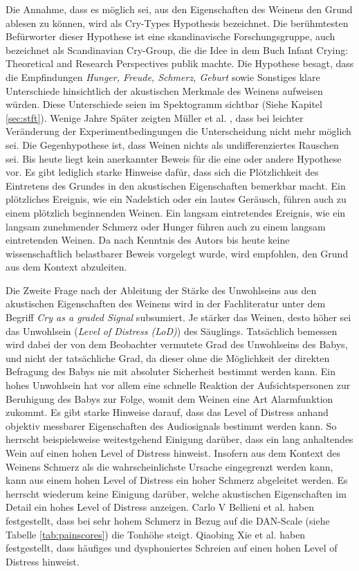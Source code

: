 Die Annahme, dass es möglich sei, aus den Eigenschaften des Weinens den Grund ablesen zu können, wird als \glqq Cry-Types Hypothesis\grqq{} bezeichnet. Die berühmtesten Befürworter dieser Hypothese ist eine skandinavische Forschungsgruppe, auch bezeichnet als \glqq Scandinavian Cry-Group\grqq , die die Idee in dem Buch \glqq Infant Crying: Theoretical and Research Perspectives\grqq \cite{crygroup} publik machte. Die Hypothese besagt, dass die Empfindungen \emph{Hunger, Freude, Schmerz, Geburt} sowie {Sonstiges} klare Unterschiede hinsichtlich der akustischen Merkmale des Weinens aufweisen würden. Diese Unterschiede seien im Spektogramm sichtbar (Siehe Kapitel \ref{sec:stft}). Wenige Jahre Später zeigten Müller et al. \cite{cryisnoise}, dass bei leichter Veränderung der Experimentbedingungen die Unterscheidung nicht mehr möglich sei. Die Gegenhypothese ist, dass Weinen \glqq nichts als undifferenziertes Rauschen\grqq{} sei. Bis heute liegt kein anerkannter Beweis für die eine oder andere Hypothese vor. Es gibt lediglich starke Hinweise dafür, dass sich die Plötzlichkeit des Eintretens des Grundes in den akustischen Eigenschaften bemerkbar macht. Ein plötzliches Ereignis, wie ein Nadelstich oder ein lautes Geräusch, führen auch zu einem plötzlich beginnenden Weinen. Ein langsam eintretendes Ereignis, wie ein langsam zunehmender Schmerz oder Hunger führen auch zu einem langsam eintretenden Weinen. Da nach Kenntnis des Autors bis heute keine wissenschaftlich belastbarer Beweis vorgelegt wurde, wird empfohlen, den Grund aus dem Kontext abzuleiten.\cite[S. 9 - 13, 17 - 19]{signal}

Die Zweite Frage nach der Ableitung der Stärke des Unwohlseins aus den akustischen Eigenschaften des Weinens wird in der Fachliteratur unter dem Begriff \emph{Cry as a graded Signal} subsumiert. Je \glqq stärker\grqq{} das Weinen, desto höher sei das Unwohlsein (\emph{Level of Distress (LoD)}) des Säuglings. Tatsächlich bemessen wird dabei der von dem Beobachter vermutete Grad des Unwohlseins des Babys, und nicht der tatsächliche Grad, da dieser ohne die Möglichkeit der direkten Befragung des Babys nie mit absoluter Sicherheit bestimmt werden kann. Ein hohes Unwohlsein hat vor allem eine schnelle Reaktion der Aufsichtspersonen zur Beruhigung des Babys zur Folge, womit dem Weinen eine Art Alarmfunktion zukommt. Es gibt starke Hinweise darauf, dass das Level of Distress anhand objektiv messbarer Eigenschaften des Audiosignals bestimmt werden kann. So herrscht beispielsweise weitestgehend Einigung darüber, dass ein \glqq lang\grqq{} anhaltendes Wein auf einen hohen Level of Distress hinweist. Insofern aus dem Kontext des Weinens Schmerz als die wahrscheinlichste Ursache eingegrenzt werden kann, kann aus einem hohen Level of Distress ein hoher Schmerz abgeleitet werden. \cite[S. 13 - 17]{signal} \cite{lod} Es herrscht wiederum keine Einigung darüber, welche akustischen Eigenschaften im Detail ein hohes Level of Distress anzeigen. Carlo V Bellieni et al. \cite{dan} haben festgestellt, dass bei sehr hohem Schmerz in Bezug auf die DAN-Scale (siehe Tabelle \ref{tab:painscores}) die Tonhöhe steigt. Qiaobing Xie et al. \cite{lod} haben festgestellt, dass häufiges und dysphoniertes Schreien auf einen hohen Level of Distress hinweist.

